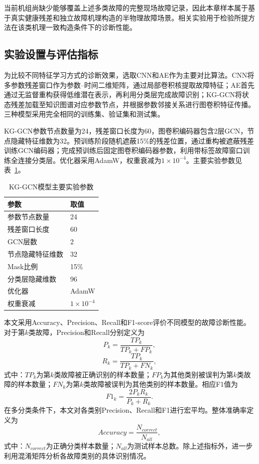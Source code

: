 当前机组尚缺少能够覆盖上述多类故障的完整现场故障记录，因此本章样本属于基于真实健康残差和独立故障机理构造的半物理故障场景。相关实验用于检验所提方法在该类机理一致构造条件下的诊断性能。

\subsection{实验设置与评估指标}
\label{subsec:experiment_setting_v7}

为比较不同特征学习方式的诊断效果，选取CNN和AE作为主要对比算法。CNN将多参数残差窗口作为参数--时间二维矩阵，通过局部卷积核提取故障特征；AE首先通过无监督重构获得低维潜在表示，再利用分类层完成故障识别；KG-GCN将状态残差加载至知识图谱对应参数节点，并根据参数邻接关系进行图卷积特征传播。三种模型采用完全相同的训练集、验证集和测试集。

KG-GCN参数节点数量为24，残差窗口长度为60，图卷积编码器包含2层GCN，节点隐藏特征维数为32。预训练阶段随机遮蔽15\%的残差位置，通过重构被遮蔽残差训练GCN编码器；完成预训练后固定图卷积编码器参数，利用带标签故障窗口训练全连接分类层。优化器采用AdamW，权重衰减为$1\times10^{-4}$。主要实验参数见表~\ref{tab:kg_setting_v7}。

\begin{table}[htbp]
    \centering
    \caption{KG-GCN模型主要实验参数}
    \label{tab:kg_setting_v7}
    \begin{tabular}{ll}
        \toprule
        参数 & 取值 \\
        \midrule
        参数节点数量 & 24 \\
        残差窗口长度 & 60 \\
        GCN层数 & 2 \\
        节点隐藏特征维数 & 32 \\
        Mask比例 & 15\% \\
        分类层隐藏维数 & 96 \\
        优化器 & AdamW \\
        权重衰减 & $1\times10^{-4}$ \\
        \bottomrule
    \end{tabular}
\end{table}

本文采用Accuracy、Precision、Recall和F1-score评价不同模型的故障诊断性能。对于第$k$类故障，Precision和Recall分别定义为
\begin{equation}
P_k=\frac{TP_k}{TP_k+FP_k},
\end{equation}
\begin{equation}
R_k=\frac{TP_k}{TP_k+FN_k},
\end{equation}
式中：$TP_k$为第$k$类故障被正确识别的样本数量；$FP_k$为其他类别被误判为第$k$类故障的样本数量；$FN_k$为第$k$类故障被误判为其他类别的样本数量。相应F1值为
\begin{equation}
F1_k=\frac{2P_kR_k}{P_k+R_k}.
\end{equation}
在多分类条件下，本文对各类别Precision、Recall和F1进行宏平均。整体准确率定义为
\begin{equation}
Accuracy=\frac{N_{correct}}{N_{all}},
\end{equation}
式中：$N_{correct}$为正确分类样本数量；$N_{all}$为测试样本总数。除上述指标外，进一步利用混淆矩阵分析各故障类别的具体识别情况。

